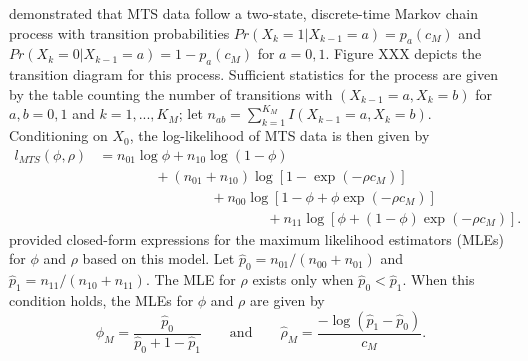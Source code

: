 \documentclass[man, noextraspace, floatsintext]{apa6}\usepackage[]{graphicx}\usepackage[]{color}
\begin{document}
\citet{Brown1977estimation} demonstrated that MTS data follow a two-state, discrete-time Markov chain process with transition probabilities $Pr(X_k = 1 | X_{k-1} = a) = p_a(c_M)$ and $Pr(X_k = 0 | X_{k-1} = a) = 1 - p_a(c_M)$ for $a = 0,1$. 
Figure XXX depicts the transition diagram for this process.
Sufficient statistics for the process are given by the table counting the number of transitions with $(X_{k-1} = a, X_k = b)$ for $a,b = 0,1$ and $k = 1,...,K_M$; let $n_{ab} = \sum_{k=1}^{K_M} I(X_{k-1} = a, X_k = b)$. 
Conditioning on $X_0$, the log-likelihood of MTS data is then given by \begin{equation}
\begin{aligned}
\label{eq:MTS_loglik}
l_{MTS}(\phi, \rho) &= n_{01} \log \phi + n_{10} \log\left(1 - \phi\right) \\
& \qquad \qquad + \left(n_{01} + n_{10}\right) \log \left[1 - \exp\left(-\rho c_M\right)\right] \\
& \qquad \qquad \qquad \qquad + n_{00} \log\left[1 - \phi + \phi \exp\left(-\rho c_M\right)\right]\\
& \qquad \qquad \qquad \qquad \qquad \qquad + n_{11}\log\left[\phi + \left(1 - \phi\right)\exp\left(-\rho c_M \right)\right].
\end{aligned}
\end{equation}
\citet{Brown1977estimation} provided closed-form expressions for the maximum likelihood estimators (MLEs) for $\phi$ and $\rho$ based on this model. Let $\hat{p}_0 = n_{01}/ \left(n_{00} + n_{01}\right)$ and $\hat{p}_1 = n_{11} / \left(n_{10} + n_{11}\right)$. The MLE for $\rho$ exists only when $\hat{p}_0 < \hat{p}_1$. 
When this condition holds, the MLEs for $\phi$ and $\rho$ are given by 
\begin{equation}
\label{eq:MTS_mle}
\hat\phi_{M} = \frac{\hat{p}_0}{\hat{p}_0 + 1 - \hat{p}_1} \qquad \text{and} \qquad
\hat\rho_{M} = \frac{- \log(\hat{p}_1 - \hat{p}_0)}{c_M}.
\end{equation}
\end{document}
